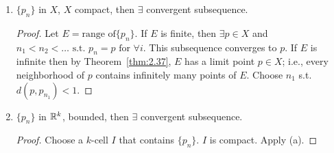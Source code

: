 \begin{theorem}
	\label{thm:3.6}
	\begin{enumerate}
		\item $\{p_n\}$ in $X$, $X$ compact, then $\exists$ convergent subsequence.
		      \begin{proof}
			      Let $E=\text{range of} \{p_n\} $. If $E$ is finite, then $\exists {p\in X}$ and $n_1<n_2<\ldots \text{ s.t. } p_n=p \text{ for } \forall i$. This subsequence converges to $p$. If $E$ is infinite then by Theorem~\ref{thm:2.37}, $E$ has a limit point $p \in X$; i.e., every neighborhood of $p$ contains infinitely many points of $E$. Choose $n_1$ s.t. $d(p,p_{n_1})<1$.

		      \end{proof}

		\item $\{ p_n \} $ in $\mathbb{R}^{k}$, bounded, then $\exists$ convergent subsequence.
		      \begin{proof}
			      Choose a $k$-cell $I$ that contains $\{p_{n}\} $. $I$ is compact. Apply (a).

		      \end{proof}

	\end{enumerate}
\end{theorem}

